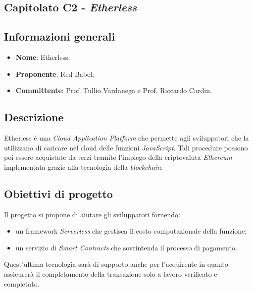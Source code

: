 \subsection{Capitolato C2 - \textit{Etherless}}
    \subsection{Informazioni generali}
        \begin{itemize}
            \item \textbf{Nome}: Etherless;
            \item \textbf{Proponente}: Red Babel;
            \item \textbf{Committente}: Prof. Tullio Vardanega e Prof. Riccardo Cardin.
        \end{itemize}
    \subsection{Descrizione}
        Etherless è una \textit{Cloud Application Platform} che permette agli sviluppatori che la utilizzano di caricare nel cloud delle funzioni
        \textit{JavaScript}. Tali procedure possono poi essere acquistate da terzi tramite l'impiego della criptovaluta \textit{Ethereum} implementata
        grazie alla tecnologia della \textit{blockchain}.
    \subsection{Obiettivi di progetto}
        Il progetto si propone di aiutare gli sviluppatori fornendo:
        \begin{itemize}
            \item un framework \textit{Serverless} che gestisca il costo computazionale della funzione;
            \item un servizio di \textit{Smart Contracts} che sovrintenda il processo di pagamento.
        \end{itemize}
        Quest'ultima tecnologia sarà di supporto anche per l'acquirente in quanto assicurerà il completamento della transazione solo a lavoro verificato e completato.

